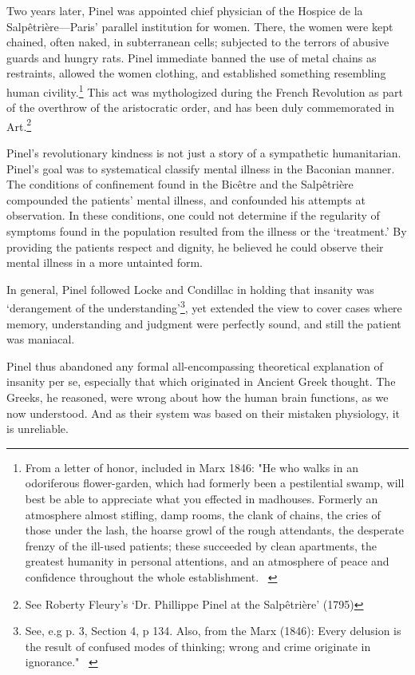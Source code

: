 \begin{refsection}
Two years later, Pinel was appointed chief physician of the Hospice de la Salpêtrière---Paris' parallel institution for women. There, the women were kept chained, often naked, in subterranean cells; subjected to the terrors of abusive guards and hungry rats. Pinel immediate banned the use of metal chains as restraints, allowed the women clothing, and established something resembling human civility.\footnote{From a letter of honor, included in Marx 1846: "He who walks in an odoriferous flower-garden, which had formerly been a pestilential swamp, will best be able to appreciate what you effected in madhouses. Formerly an atmosphere almost stifling, damp rooms, the clank of chains, the cries of those under the lash, the hoarse growl of the rough attendants, the desperate frenzy of the ill-used patients; these succeeded by clean apartments, the greatest humanity in personal attentions, and an atmosphere of peace and confidence throughout the whole establishment. ~\citep[p. 210]{Marx:1847vc}} This act was mythologized during the French Revolution as part of the overthrow of the aristocratic order, and has been duly commemorated in Art.\footnote{See Roberty Fleury's `Dr. Phillippe Pinel at the Salpêtrière' (1795)}

Pinel's revolutionary kindness is not just a story of a sympathetic humanitarian. Pinel's goal was to systematical classify mental illness in the Baconian manner. The conditions of confinement found in the Bicêtre and the Salpêtrière compounded the patients' mental illness, and confounded his attempts at observation. In these conditions, one could not determine if the regularity of symptoms found in the population resulted from the illness or the `treatment.' By providing the patients respect and dignity, he believed he could observe their mental illness in a more untainted form.

In general, Pinel followed Locke and Condillac in holding that insanity was `derangement of the understanding'\footnote{See, e.g p. 3, Section 4, p 134. Also, from the Marx (1846): Every delusion is the result of confused modes of thinking; wrong and crime originate in ignorance." ~\citep[p. 212]{Marx:1847vc}}, yet extended the view to cover cases where memory, understanding and judgment were perfectly sound, and still the patient was maniacal. 

Pinel thus abandoned any formal all-encompassing theoretical explanation of insanity per se, especially that which originated in Ancient Greek thought. The Greeks, he reasoned, were wrong about how the human brain functions, as we now understood. And as their system was based on their mistaken physiology, it is unreliable. 


\end{refsection}
